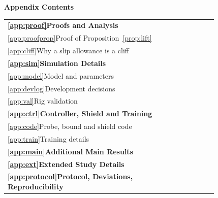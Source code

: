\setlength{\parindent}{1em}
\renewcommand{\thesection}{\Alph{section}}
\renewcommand{\thesubsection}{\thesection.\arabic{subsection}}

\noindent\begin{minipage}[t]{0.48\textwidth}
{\large\bfseries Appendix Contents}\par\medskip\small
\begin{tabular}{@{}p{0.82\linewidth}r@{}}
\textbf{\ref{app:proof}\quad Proofs and Analysis} & \textbf{\pageref{app:proof}}\\
\quad\ref{app:proofprop}\quad Proof of Proposition~\ref{prop:lift} & \pageref{app:proofprop}\\
\quad\ref{app:cliff}\quad Why a slip allowance is a cliff & \pageref{app:cliff}\\
\textbf{\ref{app:sim}\quad Simulation Details} & \textbf{\pageref{app:sim}}\\
\quad\ref{app:model}\quad Model and parameters & \pageref{app:model}\\
\quad\ref{app:devlog}\quad Development decisions & \pageref{app:devlog}\\
\quad\ref{app:val}\quad Rig validation & \pageref{app:val}\\
\textbf{\ref{app:ctrl}\quad Controller, Shield and Training} & \textbf{\pageref{app:ctrl}}\\
\quad\ref{app:code}\quad Probe, bound and shield code & \pageref{app:code}\\
\quad\ref{app:train}\quad Training details & \pageref{app:train}\\
\textbf{\ref{app:main}\quad Additional Main Results} & \textbf{\pageref{app:main}}\\
\textbf{\ref{app:ext}\quad Extended Study Details} & \textbf{\pageref{app:ext}}\\
\textbf{\ref{app:protocol}\quad Protocol, Deviations, Reproducibility} & \textbf{\pageref{app:protocol}}\\
\end{tabular}
\end{minipage}\hfill
